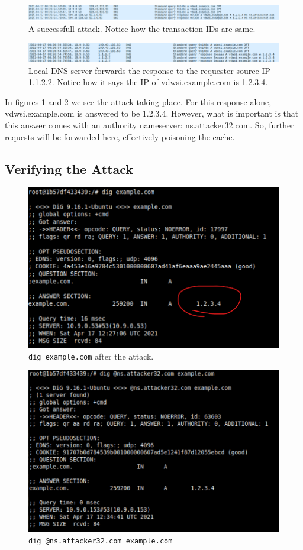\documentclass[12pt,reqno]{amsart}
\newcommand{\code}[1]{\texttt{#1}}
\begin{document}
    \begin{figure}[h]
\includegraphics[width=\linewidth]{screenshots/attack_1.png}
\caption{A successfull attack. Notice how the transaction IDs are same.}
\label{fig:atk1}
\end{figure}
 
  \begin{figure}[h]
\includegraphics[width=\linewidth]{screenshots/attack_2.png}
\caption{Local DNS server forwards the response to the requester source IP 1.1.2.2. Notice how it says the IP of vdwsi.example.com is 1.2.3.4.}
\label{fig:atk2}
\end{figure}

In figures \ref{fig:atk1} and \ref{fig:atk2} we see the attack taking place. For this response alone, vdwsi.example.com is answered to be 1.2.3.4. However, what is important is that this answer comes with an authority nameserver: ns.attacker32.com. So, further requests will be forwarded here, effectively poisoning the cache.

 \subsection*{Verifying the Attack}
  
      \begin{figure}[h]
\includegraphics[width=0.7\linewidth]{screenshots/ATTACK_SUCCESS.png}
\caption{\code{dig example.com} after the attack.}
\label{fig:vrfy1}
\end{figure}
 
 
     \begin{figure}[h]
\includegraphics[width=0.7\linewidth]{screenshots/ATTACK_VERIFY.png}
\caption{ \code{dig @ns.attacker32.com example.com} }
\label{fig:vrfy2}
\end{figure}
  
\end{document}
